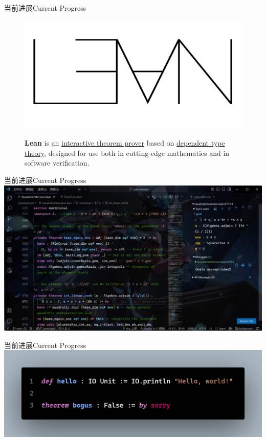 \documentclass[aspectratio=169]{beamer}
\begin{document}
    \begin{frame}{当前进展}{Current Progress}
        \begin{figure}[htpb]
        \centering
        \begin{minipage}{0.49\linewidth}
        \centering
        \includegraphics[width=0.6\linewidth]{screenshot1.png}
        \end{minipage}
        \hfill
        \begin{minipage}{0.49\linewidth}
        \textbf{Lean} is an \underline{interactive theorem prover} based on \underline{dependent type theory}, designed for use both in cutting-edge mathematics and in software verification.
        \end{minipage}
        \end{figure}
    \end{frame}
    
    \begin{frame}{当前进展}{Current Progress}
    \centering
    \includegraphics[width=0.8\linewidth]{screenshot2.png}
    \end{frame}
    
    \begin{frame}{当前进展}{Current Progress}
    \centering
    \includegraphics[width=0.8\linewidth]{screenshot3.png}
    \end{frame}
    
\end{document}
